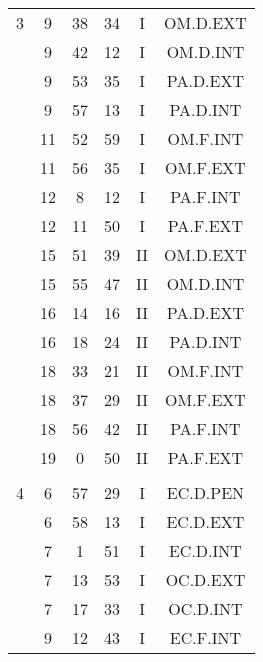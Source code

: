 \documentclass[12pt, a4paper]{article}
\begin{document}
\begin{multicols}{3}
{\begin{tabular}{c c c c c c}
	 	 	 	3 & 9 & 38 & 34 & I & OM.D.EXT\\%
	 	 	 	 & 9 & 42 & 12 & I & OM.D.INT\\%
	 	 	 	 & 9 & 53 & 35 & I & PA.D.EXT\\%
	 	 	 	 & 9 & 57 & 13 & I & PA.D.INT\\%
	 	 	 	 & 11 & 52 & 59 & I & OM.F.INT\\%
	 	 	 	 & 11 & 56 & 35 & I & OM.F.EXT\\%
	 	 	 	 & 12 & 8 & 12 & I & PA.F.INT\\%
	 	 	 	 & 12 & 11 & 50 & I & PA.F.EXT\\%
	 	 	 	 & 15 & 51 & 39 & II & OM.D.EXT\\%
	 	 	 	 & 15 & 55 & 47 & II & OM.D.INT\\%
	 	 	 	 & 16 & 14 & 16 & II & PA.D.EXT\\%
	 	 	 	 & 16 & 18 & 24 & II & PA.D.INT\\%
	 	 	 	 & 18 & 33 & 21 & II & OM.F.INT\\%
	 	 	 	 & 18 & 37 & 29 & II & OM.F.EXT\\%
	 	 	 	 & 18 & 56 & 42 & II & PA.F.INT\\%
	 	 	 	 & 19 & 0 & 50 & II & PA.F.EXT\\%
	 	 	 	 & & & & & \\%
	 	 	 	4 & 6 & 57 & 29 & I & EC.D.PEN\\%
	 	 	 	 & 6 & 58 & 13 & I & EC.D.EXT\\%
	 	 	 	 & 7 & 1 & 51 & I & EC.D.INT\\%
	 	 	 	 & 7 & 13 & 53 & I & OC.D.EXT\\%
	 	 	 	 & 7 & 17 & 33 & I & OC.D.INT\\%
	 	 	 	 & 9 & 12 & 43 & I & EC.F.INT\\%

\end{tabular}}
\end{multicols}
\end{document}
